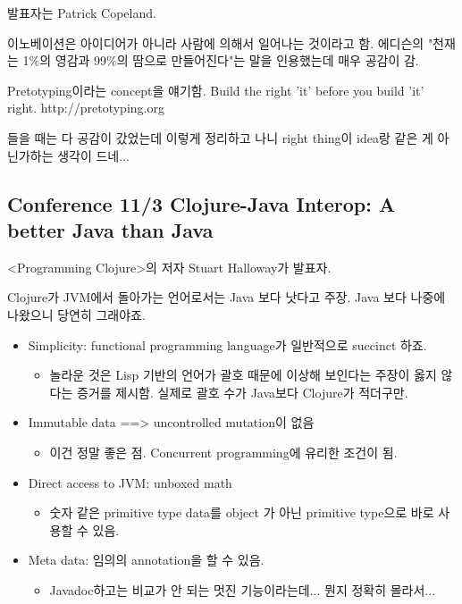 \documentclass[a4paper]{article}
\begin{document}
발표자는 Patrick Copeland.
 
이노베이션은 아이디어가 아니라 사람에 의해서 일어나는 것이라고 함.
에디슨의 "천재는 1\%의 영감과 99\%의 땀으로 만들어진다"는 말을 인용했는데 
매우 공감이 감.
 
Pretotyping이라는 concept을 얘기함.
Build the right 'it' before you build 'it' right.
http://pretotyping.org
 
들을 때는 다 공감이 갔었는데 이렇게 정리하고 나니 right thing이 idea랑 같은 게 아닌가하는 생각이 드네...
 
\subsection{Conference 11/3 Clojure-Java Interop: A better Java than Java}
 
<Programming Clojure>의 저자 Stuart Halloway가 발표자.
 
Clojure가 JVM에서 돌아가는 언어로서는 Java 보다 낫다고 주장. Java 보다 나중에 나왔으니 당연히 그래야죠.
 
\begin{itemize}
\item Simplicity: functional programming language가 일반적으로 succinct 하죠.
  \begin{itemize}
  \item 놀라운 것은 Lisp  기반의 언어가 괄호 때문에 이상해 보인다는 주장이 옳지 않다는 증거를 제시함. 실제로 괄호 수가 Java보다 Clojure가 적더구만.
  \end{itemize}

\item Immutable data ==> uncontrolled mutation이 없음
  \begin{itemize}
  \item 이건 정말 좋은 점. Concurrent programming에 유리한 조건이 됨.
  \end{itemize}

\item Direct access to JVM: unboxed math
  \begin{itemize}
  \item 숫자 같은 primitive type  data를 object 가 아닌 primitive type으로 바로 사용할 수 있음.
  \end{itemize}

\item Meta data: 임의의 annotation을 할 수 있음.
  \begin{itemize}
  \item Javadoc하고는 비교가 안 되는 멋진 기능이라는데... 뭔지 정확히 몰라서...
  \end{itemize}
\end{itemize}
 
\end{document}
